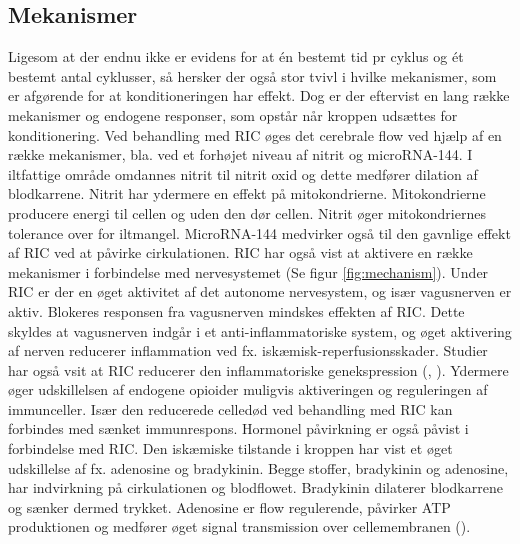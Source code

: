\subsection{Mekanismer}
Ligesom at der endnu ikke er evidens for at én bestemt tid pr cyklus og ét bestemt antal cyklusser, så hersker der også stor tvivl i hvilke mekanismer, som er afgørende for at konditioneringen har effekt.  Dog er der eftervist en lang række mekanismer og endogene responser, som opstår når kroppen udsættes for konditionering. Ved behandling med RIC øges det cerebrale flow ved hjælp af en række mekanismer, bla. ved et forhøjet niveau af nitrit og microRNA-144. I iltfattige område omdannes nitrit til nitrit oxid og dette medfører dilation af blodkarrene. Nitrit har ydermere en effekt på mitokondrierne. Mitokondrierne producere energi til cellen og uden den dør cellen. Nitrit øger mitokondriernes tolerance over for iltmangel. MicroRNA-144 medvirker også til den gavnlige effekt af RIC ved at påvirke cirkulationen.
RIC har også vist at aktivere en række mekanismer i forbindelse med nervesystemet (Se figur \ref{fig:mechanism}). Under RIC er der en øget aktivitet af det autonome nervesystem, og især vagusnerven er aktiv. Blokeres responsen fra vagusnerven mindskes effekten af RIC. Dette skyldes at vagusnerven indgår i et anti-inflammatoriske system, og øget aktivering af nerven reducerer inflammation ved fx. iskæmisk-reperfusionsskader. Studier har også vsit at RIC reducerer den inflammatoriske genekspression (\cite{RefWorks:20}, \cite{RefWorks:3}). Ydermere  øger udskillelsen af endogene opioider muligvis aktiveringen og reguleringen af immunceller. Især den reducerede celledød ved behandling med RIC kan forbindes med sænket immunrespons. Hormonel påvirkning er også påvist i forbindelse med RIC. Den iskæmiske tilstande i kroppen har vist et øget udskillelse af fx. adenosine og bradykinin. Begge stoffer, bradykinin og adenosine, har indvirkning på cirkulationen og blodflowet. Bradykinin dilaterer blodkarrene og sænker dermed trykket. Adenosine er flow regulerende, påvirker ATP produktionen og medfører øget signal transmission over cellemembranen (\cite{RefWorks:3}).

